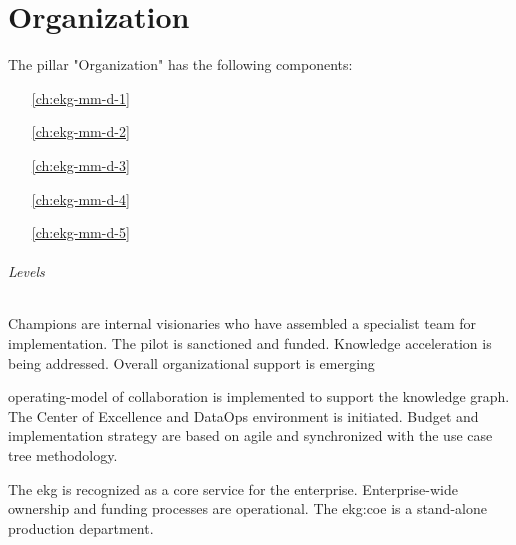 \part{Organization}\label{pt:ekgmm-d} %

The pillar "Organization" has the following components:

\begin{itemize}[leftmargin=.5in]
    \item [\ref{ch:ekg-mm-d-1}] 
    \item [\ref{ch:ekg-mm-d-2}] 
    \item [\ref{ch:ekg-mm-d-3}] 
    \item [\ref{ch:ekg-mm-d-4}] 
    \item [\ref{ch:ekg-mm-d-5}] 
\end{itemize}

\paragraph{Levels}

\begin{description}[nosep,font=\bfseries]

    \item [1. \ekgmmLevelOneLabel]
    Champions are internal visionaries who have assembled a specialist team for implementation.
    The pilot is sanctioned and funded.
    Knowledge acceleration is being addressed.
    Overall organizational support is emerging

    \item [2. \ekgmmLevelTwoLabel]
    \Gls{operating-model} of collaboration is implemented to support the knowledge graph.
    The Center of Excellence and DataOps environment is initiated.
    Budget and implementation strategy are based on agile and synchronized with the
    use case tree methodology.

    \item [3. \ekgmmLevelThreeLabel]
    The \gls{ekg} is recognized as a core service for the enterprise.
    Enterprise-wide ownership and funding processes are operational.
    The \gls{ekg:coe} is a stand-alone production department.

\end{description}





